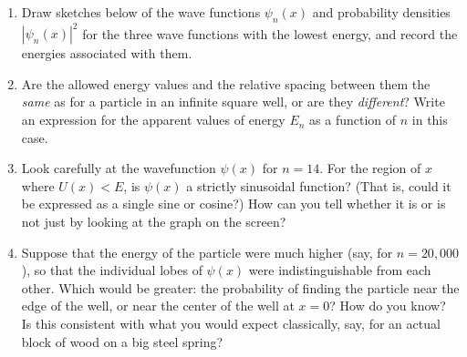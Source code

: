 \begin{enumerate}[wide]
\item Draw sketches below of the wave functions $\psi_n(x)$ and probability densities $\left|\psi_n(x)\right|^2$ for the three wave functions with the lowest energy, and record the energies associated with them.  
\answerspace{1.6in}

\item Are the allowed energy values and the relative spacing between them the \textit{same} as for a particle in an infinite square well, or are they \textit{different}?  Write an expression for the apparent values of energy $E_n$ as a function of $n$ in this case.
\answerspace{1.0in}

\item Look carefully at the wavefunction $\psi(x)$ for $n=14$.  For the region of $x$ where $U(x)<E$, is $\psi(x)$ a strictly sinusoidal function?  (That is, could it be expressed as a single sine or cosine?)  How can you tell whether it is or is not just by looking at the graph on the screen?  
\answerspace{1.0in}

\item Suppose that the energy of the particle were much higher (say, for $n=20,000$), so that the individual lobes of $\psi(x)$ were indistinguishable from each other.  Which would be greater: the probability of finding the particle near the edge of the well, or near the center of the well at $x = 0$?  How do you know?  Is this consistent with what you would expect classically, say, for an actual block of wood on a big steel spring?
\answerspace{0.8in}
\end{enumerate}
